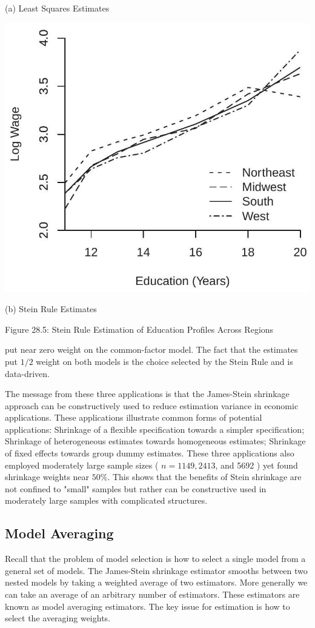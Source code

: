 \documentclass[10pt]{article}
\begin{document}
(a) Least Squares Estimates

\includegraphics[max width=\textwidth]{2022_10_23_101d59f261a704807a3bg-35(1)}

(b) Stein Rule Estimates

Figure 28.5: Stein Rule Estimation of Education Profiles Across Regions

put near zero weight on the common-factor model. The fact that the estimates put $1 / 2$ weight on both models is the choice selected by the Stein Rule and is data-driven.

The message from these three applications is that the James-Stein shrinkage approach can be constructively used to reduce estimation variance in economic applications. These applications illustrate common forms of potential applications: Shrinkage of a flexible specification towards a simpler specification; Shrinkage of heterogeneous estimates towards homogeneous estimates; Shrinkage of fixed effects towards group dummy estimates. These three applications also employed moderately large sample sizes ( $n=1149,2413$, and 5692 ) yet found shrinkage weights near $50 \%$. This shows that the benefits of Stein shrinkage are not confined to "small" samples but rather can be constructive used in moderately large samples with complicated structures.

\subsection{Model Averaging}
Recall that the problem of model selection is how to select a single model from a general set of models. The James-Stein shrinkage estimator smooths between two nested models by taking a weighted average of two estimators. More generally we can take an average of an arbitrary number of estimators. These estimators are known as model averaging estimators. The key issue for estimation is how to select the averaging weights.
\end{document}
